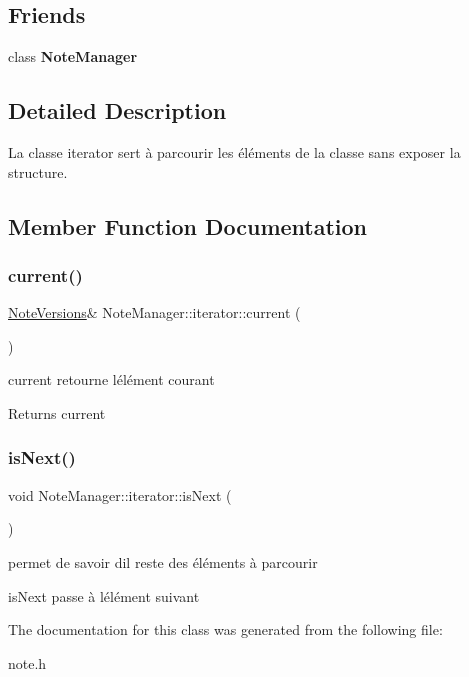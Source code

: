 \subsection*{Friends}
\begin{DoxyCompactItemize}
\item 
\mbox{\label{classNoteManager_1_1iterator_abfb606eb7f45ecd2a3b37651ceb4b859}} 
class {\bfseries Note\+Manager}
\end{DoxyCompactItemize}


\subsection{Detailed Description}
La classe iterator sert à parcourir les éléments de la classe sans exposer la structure. 

\subsection{Member Function Documentation}
\mbox{\label{classNoteManager_1_1iterator_a4b96b9137033e3a78ea91ab3b16f31cc}} 
\subsubsection{\texorpdfstring{current()}{current()}}
{\footnotesize\ttfamily \hyperlink{classNoteVersions}{Note\+Versions}\& Note\+Manager\+::iterator\+::current (\begin{DoxyParamCaption}{ }\end{DoxyParamCaption})\hspace{0.3cm}{\ttfamily [inline]}}



current retourne l\textquotesingle{}élément courant 

\begin{DoxyReturn}{Returns}
current 
\end{DoxyReturn}
\mbox{\label{classNoteManager_1_1iterator_a922ed496b52a710e58e6c96dcf778c10}} 
\subsubsection{\texorpdfstring{is\+Next()}{isNext()}}
{\footnotesize\ttfamily void Note\+Manager\+::iterator\+::is\+Next (\begin{DoxyParamCaption}{ }\end{DoxyParamCaption})\hspace{0.3cm}{\ttfamily [inline]}}



permet de savoir d\textquotesingle{}il reste des éléments à parcourir 

is\+Next passe à l\textquotesingle{}élément suivant 

The documentation for this class was generated from the following file\+:\begin{DoxyCompactItemize}
\item 
note.\+h\end{DoxyCompactItemize}

